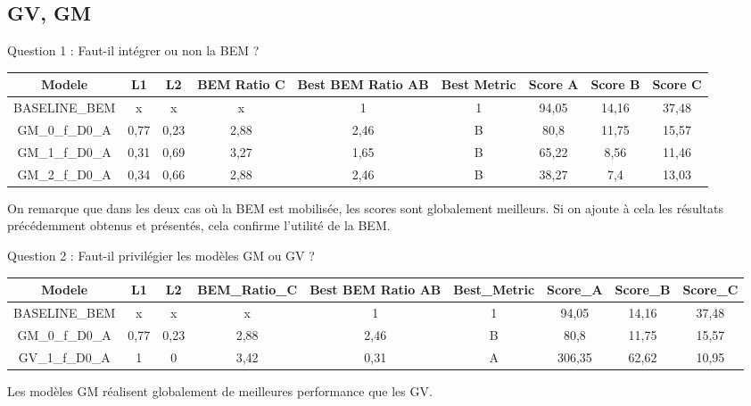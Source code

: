 \documentclass[
11pt,notheorems,hyperref={pdfauthor=whatever}
]{beamer}
\begin{document}
\subsection{GV, GM}

\begin{frame}{Question 1 : Faut-il intégrer ou non la BEM ?}
    \small
    \begin{center}
        \begin{tabular}{|c|c|c|c|c|c|c|c|c|}
                \hline
                Modele & L1 & L2 & BEM Ratio C & Best BEM Ratio AB & Best Metric & Score A & Score B & Score C   \\
                \hline
                BASELINE\_BEM    & x     & x    & x & 1 & 1 & 94,05 & 14,16 & 37,48                 \\
                GM\_0\_f\_D0\_A  &  0,77 & 0,23 &2,88 &	2,46 & B & 80,8	& 11,75 & 15,57         \\
                GM\_1\_f\_D0\_A &  0,31 & 0,69 &3,27&1,65& B & 65,22 & 8,56  & 11,46             \\
                GM\_2\_f\_D0\_A  &  0,34 & 0,66 &2,88 &	2,46 & B & 38,27	& 7,4   & 13,03        \\
                \hline
        \end{tabular}
    \end{center}

    \vspace{0.3cm}
    
    On remarque que dans les deux cas où la BEM est mobilisée, les scores sont globalement meilleurs. 
    Si on ajoute à cela les résultats précédemment obtenus et présentés, cela confirme l'utilité de la BEM.

\end{frame}

\begin{frame}{Question 2 : Faut-il privilégier les modèles GM ou GV ?}
    \small
    \begin{center}
        \begin{tabular}{|c|c|c|c|c|c|c|c|c|}
                \hline
                Modele & L1 & L2 & BEM\_Ratio\_C	& Best BEM Ratio AB & Best\_Metric & Score\_A & Score\_B & Score\_C   \\
                \hline
                BASELINE\_BEM    & x     & x    & x & 1 & 1 &  94,05 & 14,16 & 37,48                                               \\
                GM\_0\_f\_D0\_A  &  0,77 & 0,23 &2,88 &	2,46 & B & 80,8	& 11,75 & 15,57        \\
                GV\_1\_f\_D0\_A  & 1	 & 0    &3,42 & 0,31& A & 306,35 &	62,62 &	10,95                                 \\
                \hline
        \end{tabular}
    \end{center}

    \vspace{0.3cm}
    
    Les modèles GM réalisent globalement de meilleures performance que les GV.
\end{frame}
\end{document}
